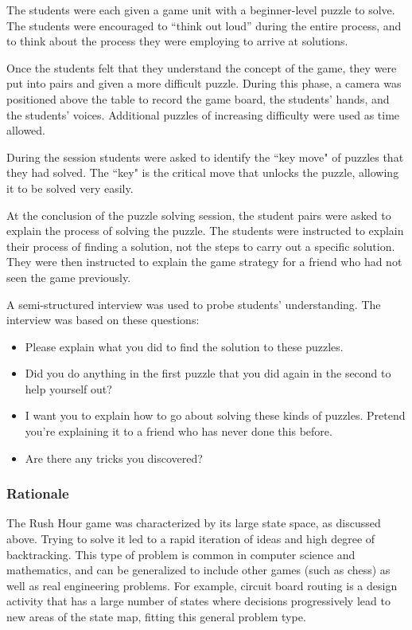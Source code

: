 	The students were each given a game unit with a beginner-level puzzle to solve.  The students were encouraged to {}``think out loud'' during the entire process, and to think about the process they were employing to arrive at solutions.
	
	Once the students felt that they understand the concept of the game, they were put into pairs and given a more difficult puzzle. During this phase, a camera was positioned above the table to record the game board, the students' hands,
	and the students' voices. Additional puzzles of increasing difficulty were used as time allowed.
	
	During the session students were asked to identify the ``key move" of puzzles that they had solved. The ``key" is the critical move that unlocks the puzzle, allowing it to be solved very easily.
	
	At the conclusion of the puzzle solving session, the student pairs were asked to explain the process of solving the puzzle. The students were instructed to explain their process of finding a solution, not the steps to carry out a specific solution. They were then instructed to explain the game strategy for a friend who had not seen the game previously.
	
	A semi-structured interview was used to probe students\textquoteright{} understanding. The interview was based on these questions:
	\begin{itemize}
	\item Please explain what you did to find the solution to these puzzles. 
	\item Did you do anything in the first puzzle that you did again in the
	second to help yourself out? 
	\item I want you to explain how to go about solving these kinds of puzzles.
	Pretend you\textquoteright{}re explaining it to a friend who has never
	done this before. 
	\item Are there any tricks you discovered? 
	\end{itemize}
	
	\subsubsection{Rationale}
	
	The Rush Hour game was characterized by its large state space, as discussed above. Trying to solve it led to a rapid iteration of ideas and high degree of backtracking. This type of problem is common in computer science and mathematics, and can be generalized to include other games (such as chess) as well as real engineering problems. For example, circuit board routing is a design activity that has a large number of states where decisions progressively lead to new areas of the state map, fitting this general problem type.

